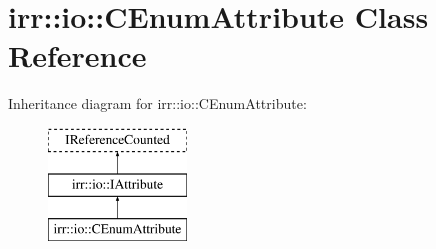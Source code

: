 \hypertarget{classirr_1_1io_1_1_c_enum_attribute}{\section{irr\-:\-:io\-:\-:C\-Enum\-Attribute Class Reference}
\label{classirr_1_1io_1_1_c_enum_attribute}
}
Inheritance diagram for irr\-:\-:io\-:\-:C\-Enum\-Attribute\-:\begin{figure}[H]
\begin{center}
\leavevmode
\includegraphics[height=3.000000cm]{classirr_1_1io_1_1_c_enum_attribute}
\end{center}
\end{figure}
